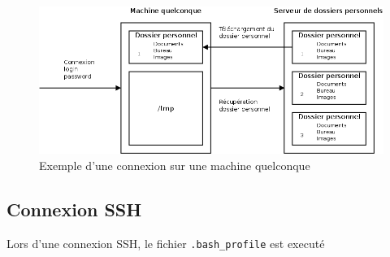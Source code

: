 \begin{figure}[h!]
  \centering
  \includegraphics[width=14cm]{images/connexion_supelec.png}
  \caption{Exemple d'une connexion sur une machine quelconque}
  \label{fig:connexion_supelec}
\end{figure}

\subsection{Connexion SSH}
\label{sec:connexion-ssh}

\par Lors d'une connexion SSH, le fichier \texttt{.bash\_profile} est executé


